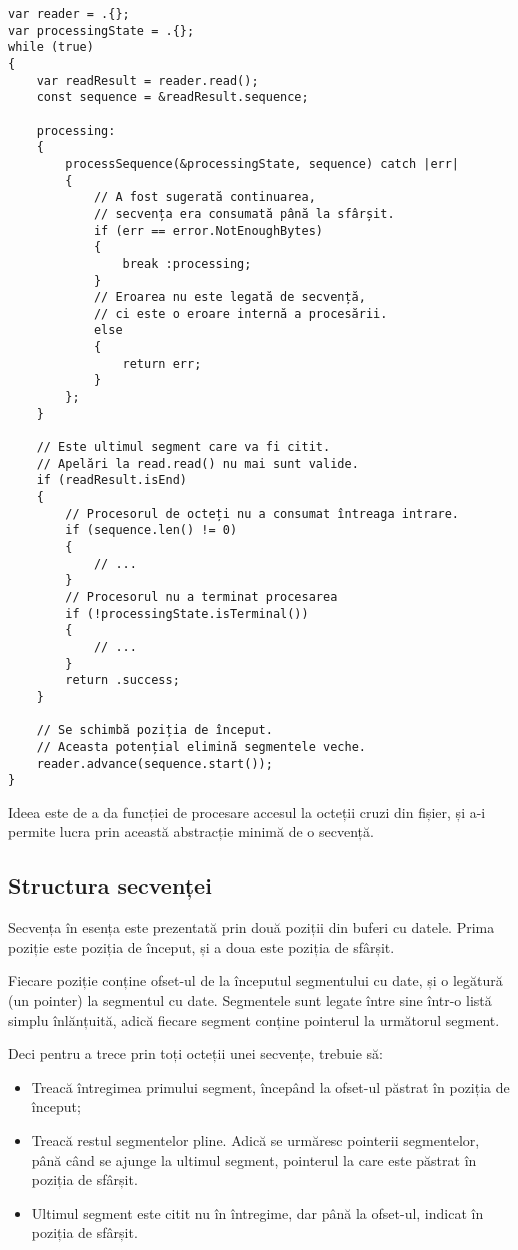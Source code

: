 \documentclass[a4paper,12pt]{report}
\begin{document}
\begin{verbatim}
var reader = .{};
var processingState = .{};
while (true)
{
    var readResult = reader.read();
    const sequence = &readResult.sequence;

    processing:
    {
        processSequence(&processingState, sequence) catch |err|
        {
            // A fost sugerată continuarea,
            // secvența era consumată până la sfârșit.
            if (err == error.NotEnoughBytes)
            {
                break :processing;
            }
            // Eroarea nu este legată de secvență,
            // ci este o eroare internă a procesării.
            else
            {
                return err;
            }
        };
    }

    // Este ultimul segment care va fi citit.
    // Apelări la read.read() nu mai sunt valide.
    if (readResult.isEnd)
    {
        // Procesorul de octeți nu a consumat întreaga intrare.
        if (sequence.len() != 0)
        {
            // ...
        }
        // Procesorul nu a terminat procesarea
        if (!processingState.isTerminal())
        {
            // ...
        }
        return .success;
    }

    // Se schimbă poziția de început.
    // Aceasta potențial elimină segmentele veche.
    reader.advance(sequence.start());
}
\end{verbatim}

Ideea este de a da funcției de procesare accesul la octeții cruzi din fișier,
și a-i permite lucra prin această abstracție minimă de o secvență.

\subsection{Structura secvenței}

Secvența în esența este prezentată prin două poziții din buferi cu datele.
Prima poziție este poziția de început, și a doua este poziția de sfârșit.

Fiecare poziție conține ofset-ul de la începutul segmentului cu date,
și o legătură (un pointer) la segmentul cu date.
Segmentele sunt legate între sine într-o listă simplu înlănțuită, adică
fiecare segment conține pointerul la următorul segment.

Deci pentru a trece prin toți octeții unei secvențe, trebuie să:
\begin{itemize}
    \item
        Treacă întregimea primului segment, începând la ofset-ul păstrat în poziția de început;
    \item
        Treacă restul segmentelor pline.
        Adică se urmăresc pointerii segmentelor, până când se ajunge la ultimul segment,
        pointerul la care este păstrat în poziția de sfârșit.
    \item
        Ultimul segment este citit nu în întregime, dar până la ofset-ul,
        indicat în poziția de sfârșit.
\end{itemize}
\end{document}
